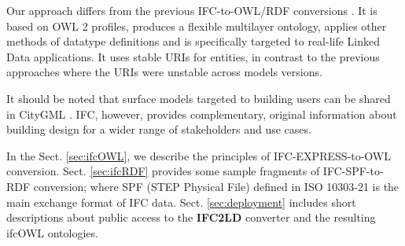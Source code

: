 

Our approach differs from the previous IFC-to-OWL/RDF conversions
\cite{beetz2005ontology,beetz2009ifcowl,pauwels2011interoperability}. It
is based on OWL 2 profiles, produces a flexible multilayer ontology, applies other methods of data\-type definitions and is specifically targeted to
real-life Linked Data applications. It uses stable URIs for entities, in contrast to the previous approaches
where the URIs were unstable across models versions.

It should be noted that surface models targeted to building users can be shared in CityGML \cite{kolbe2005citygml}. IFC, however, provides complementary, original information about building design for a wider range of stakeholders and use cases.




In the Sect. \ref{sec:ifcOWL}, we describe the principles of IFC-EXPRESS-to-OWL conversion. Sect. \ref{sec:ifcRDF} provides some sample fragments of IFC-SPF-to-RDF conversion; where SPF (STEP Physical File) defined in ISO 10303-21 \cite{ISO10303-21} is the main exchange format of IFC data. Sect. \ref{sec:deployment} includes short descriptions about public access to the \textbf{IFC2LD} converter and the resulting ifcOWL ontologies.